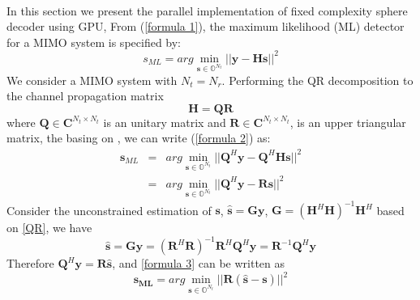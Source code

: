 \documentclass[12pt,a4paper,final]{article}
\begin{document}
\begin{spacing}{2.5}
\paragraph{}In this section we present the parallel implementation of fixed complexity sphere decoder using GPU, From (\ref{formula 1}), the maximum likelihood (ML) detector for a MIMO system is specified by:
\begin{equation}
s_{ML}=arg\min_{\mathbf{s}\in \mathbb{O}^{N_{t}}}||\mathbf{y}-\mathbf{H}\mathbf{s}||^{2} \label{formula 2}
\end{equation}
We consider a MIMO system with  $N_{t}=N_{r}$. Performing the QR decomposition to the channel propagation matrix
\begin{equation}
 \mathbf{H}=\mathbf{Q}\mathbf{R}  \label{QR}
\end{equation}
where $\mathbf{Q}\in \mathbf{C}^{N_{t}\times N_{t}}$ is an unitary matrix and $\mathbf{R}\in \mathbf{C}^{N_{t}\times N_{t}}$, is an upper triangular matrix, the basing on \cite{golub2012matrix}, we can write (\ref{formula 2}) as:
\begin{eqnarray}
\nonumber
\mathbf{s}_{ML}&=&arg\min_{\mathbf{s}\in \mathbb{O}^{N_{t}}}||\mathbf{Q}^{H}\mathbf{y}-\mathbf{Q}^{H}\mathbf{H}\mathbf{s}||^{2}\\
&=& arg\min_{\mathbf{s}\in \mathbb{O}^{N_{t}}}||\mathbf{Q}^{H}\mathbf{y}-\mathbf{R}\mathbf{s}||^{2} \label{formula 3}
\end{eqnarray}
Consider the unconstrained estimation of $\mathbf{s}$, $\mathbf{\hat{s}}=\mathbf{G}\mathbf{y}$, $\mathbf{G}=(\mathbf{H}^{H}\mathbf{H})^{-1}\mathbf{H}^{H}$ based on \ref{QR}, we have  
\begin{equation}
\mathbf{\hat{s}}=\mathbf{G}\mathbf{y}=(\mathbf{R}^{H}\mathbf{R})^{-1}\mathbf{R}^{H}\mathbf{Q}^{H}\mathbf{y}
=\mathbf{R}^{-1}\mathbf{Q}^{H}\mathbf{y}
\label{unconstrained estimation}
\end{equation} 
Therefore $\mathbf{Q}^{H}\mathbf{y}=\mathbf{R}\mathbf{\hat{s}}$, and \ref{formula 3} can be written as
\begin{equation}
\mathbf{s_{ML}}=arg\min_{\mathbf{s}\in \mathbb{O}^{N_{t}}}||\mathbf{R}(\mathbf{\hat{s}}-\mathbf{s})||^{2} \label{formula 4}
\end{equation}
\begin{figure}[tb]
\centering

\end{figure}
\end{spacing}
\end{document}
